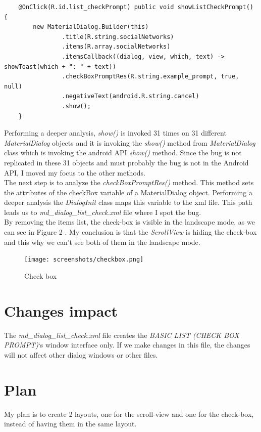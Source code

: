\documentclass[12pt]{report}
\begin{document}
  \begin{lstlisting}
    @OnClick(R.id.list_checkPrompt) public void showListCheckPrompt() {
        new MaterialDialog.Builder(this)
                .title(R.string.socialNetworks)
                .items(R.array.socialNetworks)
                .itemsCallback((dialog, view, which, text) -> showToast(which + ": " + text))
                .checkBoxPromptRes(R.string.example_prompt, true, null)
                .negativeText(android.R.string.cancel)
                .show();
    }
\end{lstlisting}
\noindent
  Performing a deeper analysis, \emph{show()} is invoked 31 times on 31 different \emph{MaterialDialog} objects and it is invoking the \emph{show()} method from \emph{MaterialDialog} class which is invoking the android API \emph{show()} method. Since the bug is not replicated in these 31 objects and must probably the bug is not in the Android API, I moved my focus to the other methods.\\
  The next step is to analyze the \emph{checkBoxPromptRes()} method. This method sets the attributes of the checkBox variable of a MaterialDialog object. Performing a deeper analysis the \emph{DialogInit} class maps this variable to the xml file. This path leads us to \emph{md\_dialog\_list\_check.xml} file where I spot the bug.\\
  By removing the items list, the check-box is visible in the landscape mode, as we can see in Figure 2 . My conclusion is that the \emph{ScrollView} is hiding the check-box and this why we can't see both of them in the landscape mode.
  \begin{figure}[H]
  \centering
  \texttt{[image: screenshots/checkbox.png]}
  \caption{Check box}
\end{figure}

\section*{Changes impact}
The \emph{md\_dialog\_list\_check.xml} file creates the \emph{BASIC LIST (CHECK BOX PROMPT)}`s window interface only. If we make changes in this file, the changes will not affect other dialog windows or other files.
 

\section*{Plan}
My plan is to create 2 layouts, one for the scroll-view and one for the check-box, instead of having them in the same layout.
\end{document}
